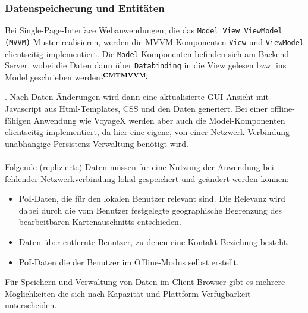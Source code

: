 \subsubsection{Datenspeicherung und Entitäten}\label{5_DSE}
Bei Single-Page-Interface Webanwendungen, die das \texttt{Model View ViewModel (MVVM)} Muster realisieren, werden die MVVM-Komponenten \texttt{View} und \texttt{ViewModel} clientseitig implementiert. Die \texttt{Model}-Komponenten befinden sich am Backend-Server, wobei die Daten dann über \texttt{Databinding} in die View gelesen bzw. ins Model geschrieben werden$^{\textbf{\ref{CMTMVVM}}}$%
\addtocounter{footnote}{1}%
. Nach Daten-Änderungen wird dann eine aktualisierte GUI-Ansicht mit Javascript aus Html-Templates, CSS und den Daten generiert. Bei einer offline-fähigen Anwendung wie VoyageX werden aber auch die Model-Komponenten clientseitig implementiert, da hier eine eigene, von einer Netzwerk-Verbindung unabhängige Persistenz-Verwaltung benötigt wird.\\ \\
Folgende (replizierte) Daten müssen für eine Nutzung der Anwendung bei fehlender Netzwerkverbindung lokal gespeichert und geändert werden können:
\begin{itemize}[leftmargin=*,noitemsep,topsep=1ex,parsep=0pt,partopsep=0pt]
\item PoI-Daten, die für den lokalen Benutzer relevant sind. Die Relevanz wird dabei durch die vom Benutzer festgelegte geographische Begrenzung des bearbeitbaren Kartenauschnitts entschieden. 
\item Daten über entfernte Benutzer, zu denen eine Kontakt-Beziehung besteht.
\item PoI-Daten die der Benutzer im Offline-Modus selbst erstellt.
\end{itemize}
Für Speichern und Verwaltung von Daten im Client-Browser gibt es mehrere Möglichkeiten die sich nach Kapazität und Plattform-Verfügbarkeit unterscheiden.

\enlargethispage{3\baselineskip} %
